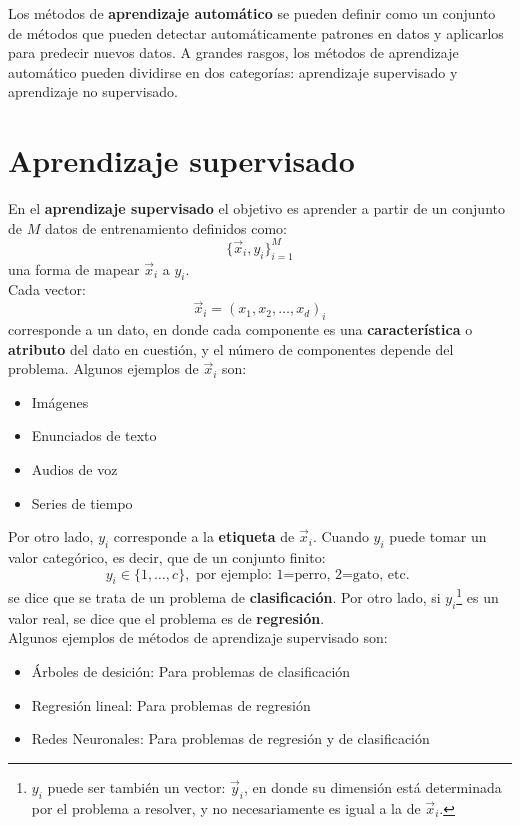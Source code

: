 Los métodos de \textbf{aprendizaje automático} se pueden definir como un conjunto de métodos que pueden detectar automáticamente patrones en datos y aplicarlos para predecir nuevos datos. A grandes rasgos, los métodos de aprendizaje automático pueden dividirse en dos categorías: aprendizaje supervisado y aprendizaje no supervisado. \cite{murphy:2013}

\section{Aprendizaje supervisado}
En el \textbf{aprendizaje supervisado} el objetivo es aprender a partir de un conjunto de $M$ datos de entrenamiento definidos como:
\begin{equation}
\{\vec{x}_i, y_i\}_{i=1}^{M}
\end{equation}
una forma de mapear $\vec{x}_i$ a $y_i$.
\\
Cada vector:
\begin{equation}
\vec{x}_i = (x_1,x_2, \dots , x_d)_i\label{eq:trainset}
\end{equation}
corresponde a un dato, en donde cada componente es una \textbf{característica} o \textbf{atributo} del dato en cuestión, y el número de componentes depende del problema. Algunos ejemplos de $\vec{x}_i$ son:
\begin{itemize}[label=\textcolor{CTtitle}{\textbullet}]
\item Imágenes
\item Enunciados de texto
\item Audios de voz
\item Series de tiempo
\end{itemize}

Por otro lado, $y_i$ corresponde a la \textbf{etiqueta} de $\vec{x}_i$. Cuando $y_i$ puede tomar un valor categórico, es decir, que de un conjunto finito:
$$y_i \in \{1,\dots,c\}, \text{  por ejemplo: 1=perro, 2=gato, etc. }$$ 
se dice que se trata de un problema de \textbf{clasificación}. Por otro lado, si $y_i$\footnote{$y_i$ puede ser también un vector: $\vec{y}_i$, en donde su dimensión está determinada por el problema a resolver, y no necesariamente es igual a la de $\vec{x}_i$.} es un valor real, se dice que el problema es de \textbf{regresión}.
\\

Algunos ejemplos de métodos de aprendizaje supervisado son:
\begin{itemize}[label=\textcolor{CTtitle}{\textbullet}]
\item Árboles de desición: Para problemas de clasificación
\item Regresión lineal: Para problemas de regresión
\item Redes Neuronales: Para problemas de regresión y de clasificación
\end{itemize}

